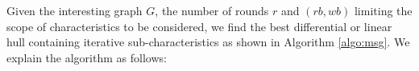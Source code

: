 



Given the interesting graph $G$, the number of rounds $r$ and $(rb,wb)$ limiting the scope of characteristics to be considered, we find the best differential or linear hull containing iterative sub-characteristics as shown in Algorithm \ref{algo:msg}. We explain the algorithm as follows: 


